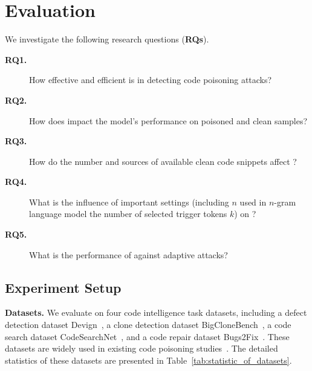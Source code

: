 \section{Evaluation}
\label{sec:evaluation}
\noindent We investigate the following research questions (\textbf{RQs}).


\begin{description}
    \item[\textbf{RQ1.}] How effective and efficient is \ours{} in detecting code poisoning attacks?
    
    \item[\textbf{RQ2.}] How does \ours{} impact the model's performance on poisoned and clean samples?

    \item[\textbf{RQ3.}] How do the number and sources of available clean code snippets affect \ours{}?

    \item[\textbf{RQ4.}] What is the influence of important settings (including $n$ used in $n$-gram language model\revise{,} the number of selected trigger tokens $k$) on \ours{}?
    
    \item[\textbf{RQ5.}] What is the performance of \ours{} against adaptive attacks?
\end{description}

\subsection{Experiment Setup}
\label{subsec:experiment_setup}





\noindent\textbf{Datasets.} We evaluate \ours{} on four code intelligence task datasets, including a defect detection dataset Devign~\cite{2019-Devign}, a clone detection dataset BigCloneBench~\cite{2014-BigCloneBench}, a  code search dataset CodeSearchNet~\cite{2019-CodeSearchNet}, and a code repair dataset Bugs2Fix~\cite{2019-Bugs2Fix}. 
These datasets are widely used in existing code poisoning studies~\cite{2022-you-see-what-I-want-you-to-see, 2023-BADCODE, 2024-Poison-Attack-and-Poison-Detection-on-Deep-Source-Code-Processing-Models}.
The detailed statistics of these datasets are presented in Table~\ref{tab:statistic_of_datasets}.


